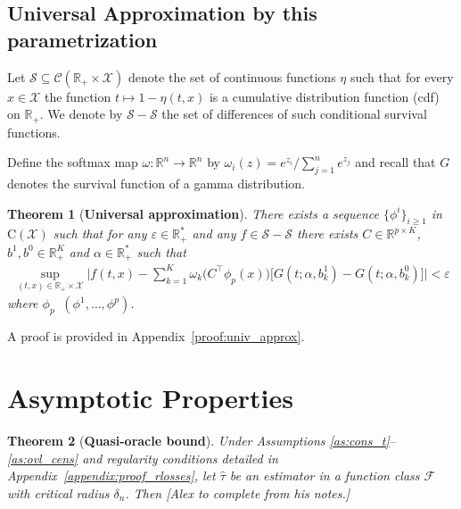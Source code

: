 \documentclass{article}
\newtheorem{theorem}{Theorem}
\DeclareMathOperator*{\eqdef }{\,\stackrel{\text{def}}{=}\,}
\newcommand{\R}{\mathbb{R}}
\begin{document}
\subsection{Universal Approximation by this parametrization}

Let $\mathcal{S} \subseteq \mathcal{C}(\R_+ \times \mathcal{X})$ denote the set of continuous functions $\eta$ such that for every $x \in \mathcal{X}$ the function $t \mapsto 1 - \eta(t,x)$ is a cumulative distribution function (cdf) on $\R_+$. We denote by $\mathcal{S}  - \mathcal{S}$ the set of differences of such conditional survival functions.


Define the softmax map $\omega:\mathbb R^n\to\mathbb R^n$ by $\omega_i(z)=e^{z_i}/ \sum_{j=1}^n e^{z_j}$ and recall that $G$ denotes the survival function of a gamma distribution.

\begin{theorem}[\bf Universal approximation] \label{thm:univ_approx}
There exists a sequence $\{\phi^i\}_{i\ge 1}$ in $\mathrm{C}(\mathcal{X})$ such that for any $\varepsilon \in \R_+^*$ and any $f \in \mathcal{S} - \mathcal{S}$ there exists $C \in \R^{p \times K}$, $b^1, b^0 \in \R_+^K$ and $\alpha \in \R_+^*$ such that
\begin{align*}
\sup_{(t,x) \in \R_+ \times \mathcal{X}} \Big| f(t,x) - \sum_{k=1}^K \omega_k\!\big(C^\top\phi_p(x)\big) \big[G(t;\alpha,b_k^1)-G(t;\alpha,b_k^0) \big]  \Big| < \varepsilon
\end{align*}
where $\phi_p \eqdef (\phi^1,\ldots,\phi^p)$.
\end{theorem}
A proof is provided in Appendix~\ref{proof:univ_approx}.


\section{Asymptotic Properties}\label{sec:asymptotics}


\begin{theorem}[{\bf Quasi-oracle bound}]\label{thm:quasi_oracle}
Under Assumptions \ref{as:cons_t}–\ref{as:ovl_cens} and regularity conditions detailed in Appendix~\ref{appendix:proof_rlosses}, let $\hat\tau$ be an estimator in a function class $\mathcal{F}$ with critical radius $\delta_n$. Then
{\color{blue}\textit{[Alex to complete from his notes.]}}
\end{theorem}
\end{document}
